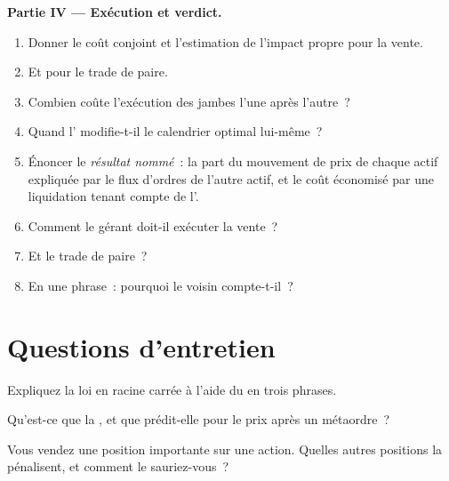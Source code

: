 \begin{problem}
\medskip\noindent\textbf{Partie IV --- Exécution et verdict.}
\begin{enumerate}[resume]
\item Donner le coût conjoint et l'estimation de l'impact propre pour la vente.
\item Et pour le trade de paire.
\item Combien coûte l'exécution des jambes l'une après l'autre~?
\item Quand l' modifie-t-il le calendrier optimal lui-même~?
\item Énoncer le \emph{résultat nommé}~: la part du mouvement de prix de chaque actif expliquée par le flux d'ordres de l'autre actif, et le coût économisé
par une liquidation tenant compte de l'.
\item Comment le gérant doit-il exécuter la vente~?
\item Et le trade de paire~?
\item En une phrase~: pourquoi le voisin compte-t-il~?
\end{enumerate}
\end{problem}

\section{Questions d'entretien}

\begin{interviewq}\label{iq:mx:metaorders-latent-liquidity-and-cross-impact:1}
Expliquez la loi en racine carrée à l'aide du  en trois phrases.
\end{interviewq}

\begin{interviewq}\label{iq:mx:metaorders-latent-liquidity-and-cross-impact:2}
Qu'est-ce que la , et que prédit-elle pour le prix après un métaordre~?
\end{interviewq}

\begin{interviewq}\label{iq:mx:metaorders-latent-liquidity-and-cross-impact:3}
Vous vendez une position importante sur une action. Quelles autres positions la pénalisent, et comment le sauriez-vous~?
\end{interviewq}


